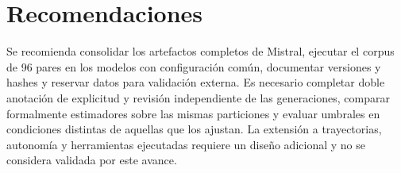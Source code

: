 \section{Recomendaciones}

Se recomienda consolidar los artefactos completos de Mistral, ejecutar el corpus de 96 pares en los modelos con configuración común, documentar versiones y hashes y reservar datos para validación externa. Es necesario completar doble anotación de explicitud y revisión independiente de las generaciones, comparar formalmente estimadores sobre las mismas particiones y evaluar umbrales en condiciones distintas de aquellas que los ajustan. La extensión a trayectorias, autonomía y herramientas ejecutadas requiere un diseño adicional y no se considera validada por este avance.
